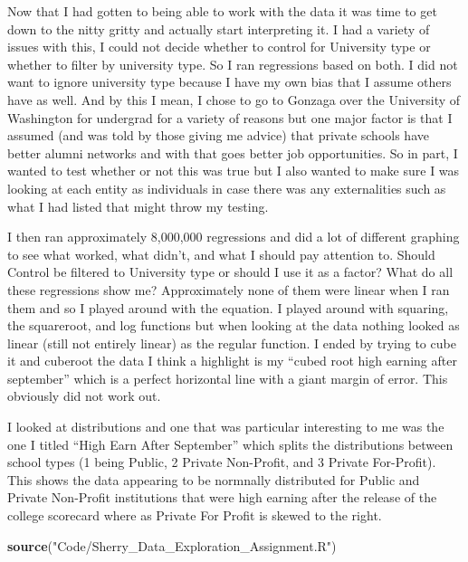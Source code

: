 \documentclass[
]{article}
\newenvironment{Shaded}{\begin{snugshade}}{\end{snugshade}}
\newcommand{\KeywordTok}[1]{\textcolor[rgb]{0.13,0.29,0.53}{\textbf{#1}}}
\newcommand{\NormalTok}[1]{#1}
\newcommand{\StringTok}[1]{\textcolor[rgb]{0.31,0.60,0.02}{#1}}
\begin{document}
Now that I had gotten to being able to work with the data it was time to
get down to the nitty gritty and actually start interpreting it. I had a
variety of issues with this, I could not decide whether to control for
University type or whether to filter by university type. So I ran
regressions based on both. I did not want to ignore university type
because I have my own bias that I assume others have as well. And by
this I mean, I chose to go to Gonzaga over the University of Washington
for undergrad for a variety of reasons but one major factor is that I
assumed (and was told by those giving me advice) that private schools
have better alumni networks and with that goes better job opportunities.
So in part, I wanted to test whether or not this was true but I also
wanted to make sure I was looking at each entity as individuals in case
there was any externalities such as what I had listed that might throw
my testing.

I then ran approximately 8,000,000 regressions and did a lot of
different graphing to see what worked, what didn't, and what I should
pay attention to. Should Control be filtered to University type or
should I use it as a factor? What do all these regressions show me?
Approximately none of them were linear when I ran them and so I played
around with the equation. I played around with squaring, the squareroot,
and log functions but when looking at the data nothing looked as linear
(still not entirely linear) as the regular function. I ended by trying
to cube it and cuberoot the data I think a highlight is my ``cubed root
high earning after september'' which is a perfect horizontal line with a
giant margin of error. This obviously did not work out.

I looked at distributions and one that was particular interesting to me
was the one I titled ``High Earn After September'' which splits the
distributions between school types (1 being Public, 2 Private
Non-Profit, and 3 Private For-Profit). This shows the data appearing to
be normnally distributed for Public and Private Non-Profit institutions
that were high earning after the release of the college scorecard where
as Private For Profit is skewed to the right.

\begin{Shaded}
\begin{Highlighting}[]
\KeywordTok{source}\NormalTok{(}\StringTok{"Code/Sherry\_Data\_Exploration\_Assignment.R"}\NormalTok{)}
\end{Highlighting}
\end{Shaded}
\end{document}
